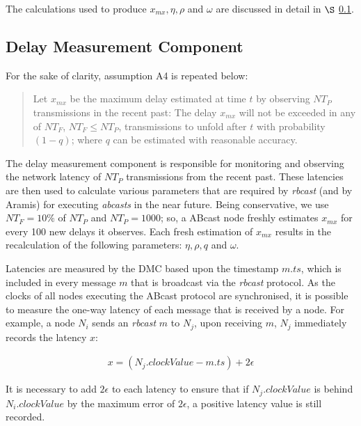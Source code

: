     The calculations used to produce $x_{mx}, \eta, \rho$ and $\omega$ are discussed in detail in $\S$ \ref{ssec:dmc}.  
    
    \subsection{Delay Measurement Component}\label{ssec:dmc}
        For the sake of clarity, assumption A4 is repeated below:   
        
        \begin{quotation}
            Let $x_{mx}$ be the maximum delay estimated at time $t$ by observing $NT_P$ transmissions in the recent past: The delay $x_{mx}$ will not be exceeded in any of $NT_F$, $NT_F \leq NT_P$, transmissions to unfold after $t$ with probability $(1 - q)$; where $q$ can be estimated with reasonable accuracy.  
        \end{quotation}
    
        The delay measurement component is responsible for monitoring and observing the network latency of $NT_P$ transmissions from the recent past.  These latencies are then used to calculate various parameters that are required by \emph{rbcast} (and by \textsf{Aramis}) for executing \emph{abcasts} in the near future.  Being conservative, we use $NT_F = 10\%$ of $NT_P$ and $NT_P=1000$; so, a \textsf{ABcast} node freshly estimates $x_{mx}$ for every 100 new delays it observes.  Each fresh estimation of $x_{mx}$ results in the recalculation of the following parameters: $\eta, \rho, q$ and $\omega$.  
        
        Latencies are measured by the DMC based upon the timestamp $m.ts$, which is included in every message $m$ that is broadcast via the \emph{rbcast} protocol.  As the clocks of all nodes executing the \textsf{ABcast} protocol are synchronised, it is possible to measure the one-way latency of each message that is received by a node.  For example, a node $N_i$ sends an \emph{rbcast} $m$ to $N_j$, upon receiving $m$, $N_j$ immediately records the latency $x$:

        \begin{equation*}
             \begin{aligned}
                 x = (N_j.clockValue - m.ts) + 2\epsilon
             \end{aligned}
        \end{equation*}        
        
        It is necessary to add $2\epsilon$ to each latency to ensure that if $N_j.clockValue$ is behind $N_i.clockValue$ by the maximum error of $2\epsilon$, a positive latency value is still recorded.  
                                
